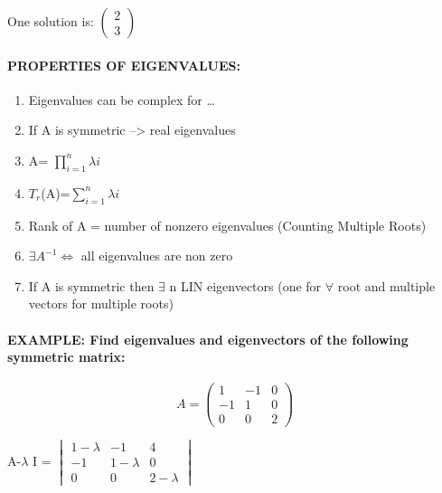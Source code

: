 \documentclass[]{article}
\providecommand{\tightlist}{%
  \setlength{\itemsep}{0pt}\setlength{\parskip}{0pt}}
\let\oldparagraph\paragraph
\renewcommand{\paragraph}[1]{\oldparagraph{#1}\mbox{}}
\begin{document}
One solution is: \(\begin{pmatrix} 2 \\ 3\end{pmatrix}\)

\hspace{3cm}

\paragraph{PROPERTIES OF EIGENVALUES:}\label{properties-of-eigenvalues}

\begin{enumerate}
\def\labelenumi{\roman{enumi})}
\tightlist
\item
  Eigenvalues can be complex for \ldots{}
\item
  If A is symmetric --\textgreater{} real eigenvalues
\item
  \textbar{}A\textbar{}= \(\prod\limits_{i=1}^{n} \lambda{i}\)
\item
  \(T_{r}\)(A)=\(\sum\limits_{i=1}^{n} \lambda{i}\)
\item
  Rank of A = number of nonzero eigenvalues (Counting Multiple Roots)
\item
  \(\exists A^{-1} \Longleftrightarrow\) all eigenvalues are non zero
\item
  If A is symmetric then \(\exists\) n LIN eigenvectors (one for
  \(\forall\) root and multiple vectors for multiple roots)
\end{enumerate}

\newpage

\paragraph{\texorpdfstring{EXAMPLE: Find eigenvalues and eigenvectors of
the following symmetric matrix:\\
}{EXAMPLE: Find eigenvalues and eigenvectors of the following symmetric matrix: }}\label{example-find-eigenvalues-and-eigenvectors-of-the-following-symmetric-matrix}

\[A=\begin{pmatrix}  1 & -1 & 0\\ -1 & 1 & 0\\ 0 & 0 & 2\end{pmatrix}\]

\textbar{}A-\(\lambda\) I\textbar{} =
\(\begin{vmatrix} 1-\lambda & -1 & 4 \\ -1 & 1-\lambda & 0 \\ 0 & 0 & 2-\lambda\end{vmatrix}\)
\end{document}
